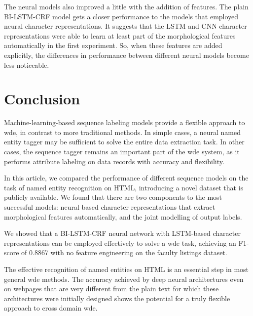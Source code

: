 \documentclass{nle}
\begin{document}
The neural models also improved a little with the addition of features. The plain BI-LSTM-CRF
model gets a closer performance to the models that employed neural character 
representations. It suggests that the LSTM and CNN character representations 
were able to learn at least part of the morphological features automatically in the
first experiment. So, when these features are added explicitly, the differences 
in performance between different neural models become less noticeable.

\section{Conclusion}

Machine-learning-based sequence labeling models provide a flexible approach to \gls{wde}, 
in contrast to more traditional methods. In simple cases, a neural
named entity tagger may be sufficient to solve the entire data extraction task. In 
other cases, the sequence tagger remains an important part of the \gls{wde} 
system, as it performs attribute labeling on data records with accuracy and flexibility.

In this article, we compared the performance of different sequence models on the task of
named entity recognition on HTML, introducing a novel dataset that is publicly available. 
We found that there are two components to the most successful models: neural based character 
representations that extract morphological features automatically, and the joint modelling 
of output labels.

We showed that a BI-LSTM-CRF neural network with LSTM-based character representations can 
be employed effectively to solve a \gls{wde} task, achieving an F1-score of 
0.8867 with no feature engineering on the faculty listings dataset.

The effective recognition of named entities on HTML is an essential step in most general 
\gls{wde} methods. The accuracy achieved by deep neural architectures even
on webpages that are very different from the plain text for which these architectures 
were initially designed shows the potential for a truly flexible approach to cross domain 
\gls{wde}.

% 
% 
\end{document}
